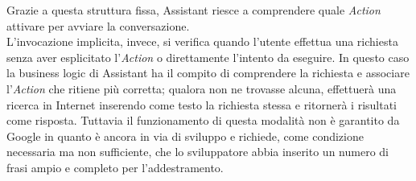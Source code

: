 		Grazie a questa struttura fissa, Assistant riesce a comprendere quale \emph{Action} attivare per avviare la conversazione. \\
		L'invocazione implicita, invece, si verifica quando l'utente effettua una richiesta senza aver esplicitato l'\emph{Action} o direttamente l'intento da eseguire. In questo caso la business logic di Assistant ha il compito di comprendere la richiesta e associare l'\emph{Action} che ritiene più corretta; qualora non ne trovasse alcuna, effettuerà una ricerca in Internet inserendo come testo la richiesta stessa e ritornerà i risultati come risposta. Tuttavia il funzionamento di questa modalità non è garantito da Google in quanto è ancora in via di sviluppo e richiede, come condizione necessaria ma non sufficiente, che lo sviluppatore abbia inserito un numero di frasi ampio e completo per l'addestramento.

